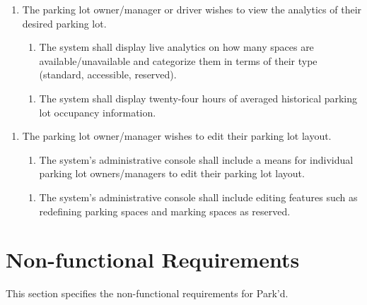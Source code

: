 \documentclass[12pt,letterpaper]{article}
\newcounter{businesseventnum}
\newcounter{funcreqnum}
\begin{document}
\color{red} {
    \begin{enumerate}[{BE}\thebusinesseventnum.] 
    \item The parking lot owner/manager or driver wishes to view the analytics
    of their desired parking lot.
    
    \begin{enumerate}[{FR}\thefuncreqnum.] 
        \item The system shall display live analytics on how many spaces are
        available/unavailable and categorize them in terms of their type
        (standard, accessible, reserved).
    \end{enumerate}

    \begin{enumerate}[{FR}\thefuncreqnum.] 
        \item The system shall display twenty-four hours of averaged historical
        parking lot occupancy information.
    \end{enumerate}
    \end{enumerate}
}

\color{black}
\begin{enumerate}[{BE}\thebusinesseventnum.] 
\item The parking lot owner/manager wishes to edit their parking lot layout.
\begin{enumerate}[{FR}\thefuncreqnum.] 
    \item The system's administrative console shall include a means for
    individual parking lot owners/managers to edit their parking lot layout.
\end{enumerate}
\begin{enumerate}[{FR}\thefuncreqnum.] 
    \item The system's administrative console shall include editing features
    such as redefining parking spaces and marking spaces as reserved.
\end{enumerate}
\end{enumerate}

\section{Non-functional Requirements}
This section specifies the non-functional requirements for Park'd.
\end{document}
